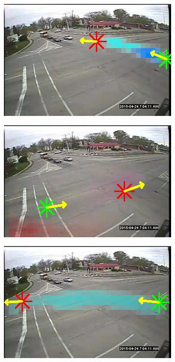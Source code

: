 \begin{figure}[!h]
\begin{subfigure}{0.32\linewidth}
            \includegraphics[width=\linewidth]{./img/scene_learning/res/230955/230955-2.jpg}
        \end{subfigure}
        \begin{subfigure}{0.32\linewidth}
            \includegraphics[width=\linewidth]{./img/scene_learning/res/230955/230955-3.jpg}
        \end{subfigure}
        \begin{subfigure}{0.32\linewidth}
            \includegraphics[width=\linewidth]{./img/scene_learning/res/230955/230955-4.jpg}

\end{subfigure}
\end{figure}
